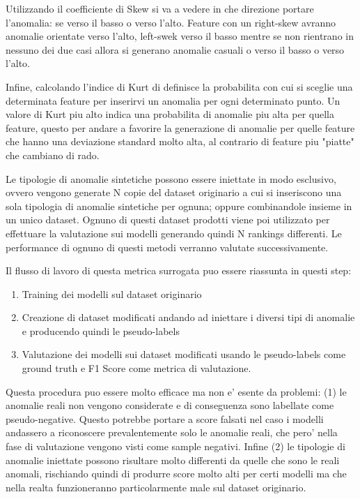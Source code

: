 Utilizzando il coefficiente di Skew si va a vedere in che direzione portare l'anomalia: se verso il basso o verso l'alto. Feature con un right-skew avranno anomalie orientate verso l'alto, left-swek verso il basso mentre se non rientrano in nessuno dei due casi allora si generano anomalie casuali o verso il basso o verso l'alto.

Infine, calcolando l'indice di Kurt di definisce la probabilita con cui si sceglie una determinata feature per inserirvi un anomalia per ogni determinato punto. Un valore di Kurt piu alto indica una probabilita di anomalie piu alta per quella feature, questo per andare a favorire la generazione di anomalie per quelle feature che hanno una deviazione standard molto alta, al contrario di feature piu "piatte" che cambiano di rado.


Le tipologie di anomalie sintetiche possono essere iniettate in modo esclusivo, ovvero vengono generate N copie del dataset originario a cui si inseriscono una sola tipologia di anomalie sintetiche per ognuna; oppure combinandole insieme in un unico dataset. 
Ognuno di questi dataset prodotti viene poi utilizzato per effettuare la valutazione sui modelli generando quindi N rankings differenti. Le performance di ognuno di questi metodi verranno valutate successivamente.

Il flusso di lavoro di questa metrica surrogata puo essere riassunta in questi step:
\begin{enumerate}
\item Training dei modelli sul dataset originario
\item Creazione di dataset modificati andando ad iniettare i diversi tipi di anomalie e producendo quindi le pseudo-labels
\item Valutazione dei modelli sui dataset modificati usando le pseudo-labels come ground truth e F1 Score come metrica di valutazione.
\end{enumerate}


Questa procedura puo essere molto efficace ma non e' esente da problemi: (1) le anomalie reali non vengono considerate e di conseguenza sono labellate come pseudo-negative. Questo potrebbe portare a score falsati nel caso i modelli andassero a riconoscere prevalentemente solo le anomalie reali, che pero' nella fase di valutazione vengono visti come sample negativi. Infine (2) le tipologie di anomalie iniettate possono risultare molto differenti da quelle che sono le reali anomali, rischiando quindi di produrre score molto alti per certi modelli ma che nella realta funzioneranno particolarmente male sul dataset originario.


